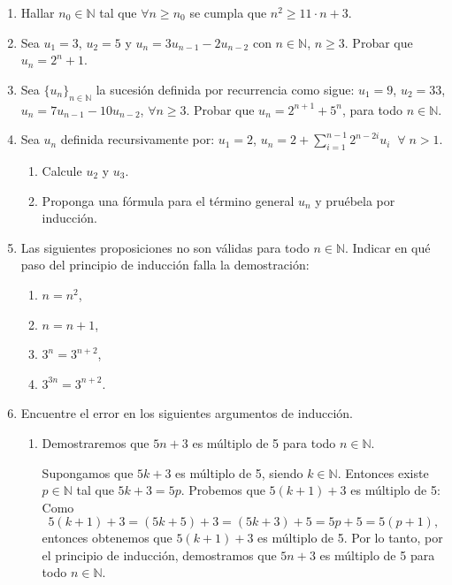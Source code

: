 \documentclass[12pt,spanish,makeidx]{amsbook}
\begin{document}
\begin{enumerate}
\item Hallar $n_0 \in {\mathbb N}$ tal que $\forall n \ge n_0$ se cumpla que $n^2 \ge 11 \cdot n + 3$.


\medskip


\item Sea $u_1=3$, $u_2=5$ y $u_n=3 u_{n-1} - 2 u_{n-2}$ con $n\in \mathbb N$, $n\geq 3$.
Probar que $u_n=2^n+1$.

\smallskip

\item Sea $\{ u_n \}_{n \in \mathbb N}$ la sucesión definida por recurrencia como sigue: $u_1 = 9$, $u_2 = 33$, $u_n = 7u_{n-1} - 10u_{n-2}$, $\forall n \geq 3$. Probar que $u_n = 2^{n+1} + 5^n$, para todo $n \in \mathbb N$.

\smallskip

\item Sea $u_n$ definida recursivamente por: $u_1=2$, $u_n=2+\sum_{i=1}^{n-1}2^{n-2i}u_i \;\;\forall\; n >1$.
\begin{enumerate}
	\item Calcule $u_2$ y $u_3$.
	\item Proponga una fórmula para el término general $u_n$ y pruébela por inducción.
\end{enumerate}

\smallskip


\item Las siguientes proposiciones no son válidas para todo $n \in {\mathbb N}$. Indicar en qué paso del principio de inducción falla la demostración:
\begin{multicols}{4}
\begin{enumerate}
\item  $n=n^2$,
\item  $n=n+1$,
\item  $3^n = 3^{n+2}$,
\item  $3^{3n} = 3^{n+2}$.
\end{enumerate}
\end{multicols}

\smallskip

\item Encuentre el error en los siguientes argumentos de inducción.
\begin{enumerate}
\item  Demostraremos que $5n+3$ es múltiplo de 5 para todo $n\in \mathbb N$.

Supongamos que $5k+3$ es múltiplo de 5, siendo $k\in \mathbb N$. Entonces existe
$p\in \mathbb N$ tal que  $5k+3=5p$. Probemos que $5(k+1)+3$ es múltiplo de 5:
Como
$$
5(k+1)+3=(5k+5)+3=(5k+3)+5=5p+5=5(p+1),
$$
entonces obtenemos que $5(k+1)+3$ es múltiplo de 5. Por lo tanto, por el principio
de inducción, demostramos que $5n+3$ es múltiplo de 5 para todo $n\in \mathbb
N$.


\end{enumerate}
\end{enumerate}
\end{document}
